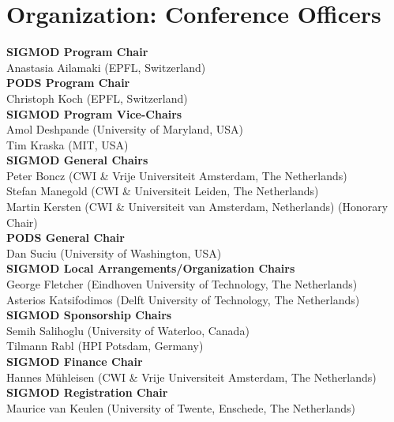 \clearpage
\section*{Organization: Conference Officers}

{\small

\textbf{SIGMOD Program Chair}
\\ Anastasia Ailamaki \textsf{\footnotesize(EPFL, Switzerland)}
\\[2.4ex]
\textbf{PODS Program Chair}
\\ Christoph Koch \textsf{\footnotesize(EPFL, Switzerland)}
\\[2.4ex]
\textbf{SIGMOD Program Vice-Chairs}
\\ Amol Deshpande \textsf{\footnotesize(University of Maryland, USA)}
\\ Tim Kraska \textsf{\footnotesize(MIT, USA)}
\\[2.4ex]
\textbf{SIGMOD General Chairs}
\\ Peter Boncz \textsf{\footnotesize(CWI \& Vrije Universiteit Amsterdam, The Netherlands)}
\\ Stefan Manegold \textsf{\footnotesize(CWI \& Universiteit Leiden, The Netherlands)}
\\ Martin Kersten \textsf{\footnotesize(CWI \& Universiteit van Amsterdam, Netherlands) (Honorary Chair)}
\\[2.4ex]
\textbf{PODS General Chair}
\\ Dan Suciu \textsf{\footnotesize(University of Washington, USA)}
\\[2.4ex]
\textbf{SIGMOD Local Arrangements/Organization Chairs}
\\ George Fletcher \textsf{\footnotesize(Eindhoven University of Technology, The Netherlands)}
\\ Asterios Katsifodimos \textsf{\footnotesize(Delft University of Technology, The Netherlands)}
\\[2.4ex]
\textbf{SIGMOD Sponsorship Chairs}
\\ Semih Salihoglu \textsf{\footnotesize(University of Waterloo, Canada)}
\\ Tilmann Rabl \textsf{\footnotesize(HPI Potsdam, Germany)}
\\[2.4ex]
\textbf{SIGMOD Finance Chair}
\\ Hannes Mühleisen \textsf{\footnotesize(CWI \& Vrije Universiteit Amsterdam, The Netherlands)}
\\[2.4ex]
\textbf{SIGMOD Registration Chair}
\\ Maurice van Keulen \textsf{\footnotesize(University of Twente, Enschede, The Netherlands)}
}
